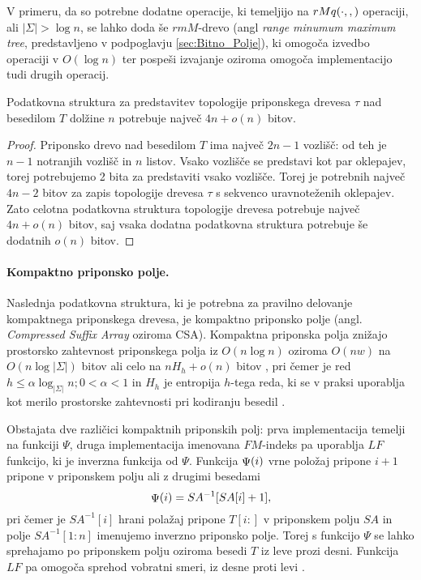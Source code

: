 V primeru, da so potrebne dodatne operacije, ki temeljijo na $ \mathop{rMq}(\cdot,,) $ operaciji, ali $|\Sigma|>\log{n}$, se lahko doda še $rmM$-drevo (angl \textit{range minumum maximum tree}, predstavljeno v podpoglavju \ref{sec:Bitno_Polje}), ki omogoča izvedbo operaciji v $O(\log{n})$ ter pospeši izvajanje oziroma omogoča implementacijo tudi drugih operacij.

\begin{lema}\label{lema:BP}
 Podatkovna struktura za predstavitev topologije priponskega drevesa $\tau$ nad besedilom $T$ dolžine $n$ potrebuje največ $4n+o(n)$ bitov.
\end{lema}

\begin{proof}
Priponsko drevo nad besedilom $T$ ima največ $2n-1$ vozlišč: od teh je $n-1$ notranjih vozlišč in $n$ listov. Vsako vozlišče se predstavi kot par oklepajev, torej potrebujemo 2 bita za predstaviti vsako vozlišče. Torej je potrebnih največ $4n-2$ bitov za zapis topologije drevesa $\tau$ s sekvenco uravnoteženih oklepajev. Zato celotna podatkovna struktura topologije drevesa potrebuje največ $4n+o(n)$ bitov, saj vsaka dodatna podatkovna struktura potrebuje še dodatnih $o(n)$ bitov.
\end{proof}

\paragraph{Kompaktno priponsko polje.}
Naslednja podatkovna struktura, ki je potrebna za pravilno delovanje kompaktnega priponskega drevesa, je kompaktno priponsko polje (angl. \textit{Compressed Suffix Array} oziroma CSA). Kompaktna priponska polja znižajo prostorsko zahtevnost priponskega polja iz $O(n\log{n})$ oziroma $O(nw)$ na $O(n\log{|\Sigma|})$ bitov \cite{Grossi2000} ali celo na $nH_h +o(n)$ bitov \cite{Grossi2003}, pri čemer je red $h\le\alpha\log_{|\Sigma|}{n};0<\alpha<1$ in $H_h$ je entropija $h$-tega reda, ki se v praksi uporablja kot merilo prostorske zahtevnosti pri kodiranju besedil \cite{Navarro2016}.

Obstajata dve različici kompaktnih priponskih polj: prva implementacija temelji na funkciji $\Psi$, druga implementacija imenovana $FM$-indeks pa uporablja $LF$ funkcijo, ki je inverzna funkcija od $\Psi$. Funkcija $ \mathop{\Psi}(i) $ vrne položaj pripone $i+1$ pripone v priponskem polju ali z drugimi besedami
$$
     \mathop{\Psi}(i) =SA^{-1}[SA[i]+1],
$$
pri čemer je $SA^{-1}[i]$ hrani polažaj pripone $T[i:]$ v priponskem polju $SA$ in polje $SA^{-1}[1:n]$ imenujemo inverzno priponsko polje. Torej s funkcijo $\Psi$ se lahko sprehajamo po priponskem polju oziroma besedi $T$ iz leve prozi desni. Funkcija $LF$ pa omogoča sprehod vobratni smeri, iz desne proti levi \cite{Navarro2016, Sadakane2007}.


